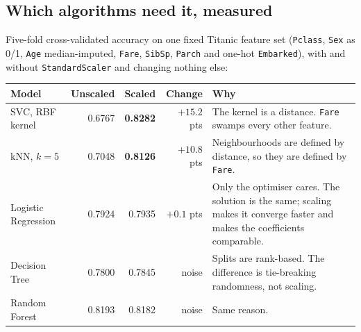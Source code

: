 \documentclass[11pt,a4paper]{article}
\begin{document}

\subsection{Which algorithms need it, measured}

Five-fold cross-validated accuracy on one fixed Titanic feature set (\texttt{Pclass},
\texttt{Sex} as 0/1, \texttt{Age} median-imputed, \texttt{Fare}, \texttt{SibSp},
\texttt{Parch} and one-hot \texttt{Embarked}), with and without \lstinline|StandardScaler|
and changing nothing else:

\begin{tabularx}{\textwidth}{@{}l r r r X@{}}
\toprule
\rowcolor{tablehead} \textbf{Model} & \textbf{Unscaled} & \textbf{Scaled} & \textbf{Change} & \textbf{Why} \\
\midrule
SVC, RBF kernel & 0.6767 & \textbf{0.8282} & $+15.2$ pts & The kernel is a distance. \texttt{Fare} swamps every other feature. \\
kNN, $k=5$ & 0.7048 & \textbf{0.8126} & $+10.8$ pts & Neighbourhoods are defined by distance, so they are defined by \texttt{Fare}. \\
Logistic Regression & 0.7924 & 0.7935 & $+0.1$ pts & Only the optimiser cares. The solution is the same; scaling makes it converge faster and makes the coefficients comparable. \\
Decision Tree & 0.7800 & 0.7845 & noise & Splits are rank-based. The difference is tie-breaking randomness, not scaling. \\
Random Forest & 0.8193 & 0.8182 & noise & Same reason. \\
\bottomrule
\end{tabularx}

\end{document}
